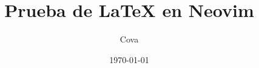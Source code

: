 \documentclass[12pt]{article}
\title{Prueba de LaTeX en Neovim}
\author{Cova}
\date{\today}
\begin{document}
\maketitle

\section{}
\end{document}
